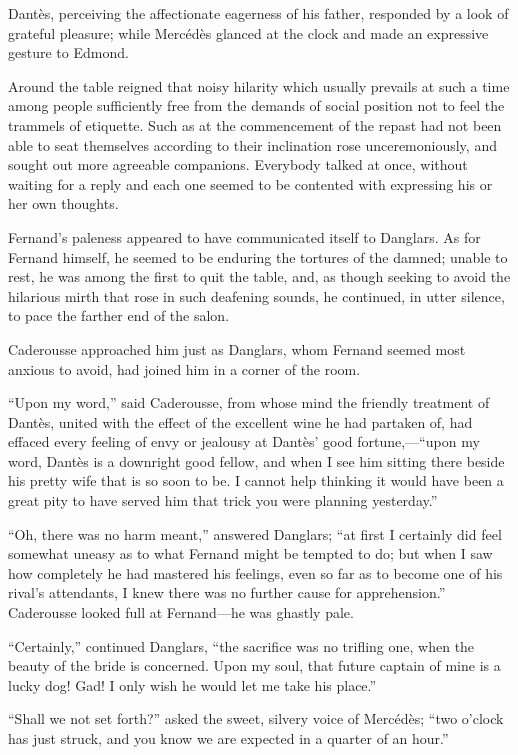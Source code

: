 Dantès, perceiving the affectionate eagerness of his father, responded
by a look of grateful pleasure; while Mercédès glanced at the clock and
made an expressive gesture to Edmond.

Around the table reigned that noisy hilarity which usually prevails at
such a time among people sufficiently free from the demands of social
position not to feel the trammels of etiquette. Such as at the
commencement of the repast had not been able to seat themselves
according to their inclination rose unceremoniously, and sought out
more agreeable companions. Everybody talked at once, without waiting
for a reply and each one seemed to be contented with expressing his or
her own thoughts.

Fernand’s paleness appeared to have communicated itself to Danglars. As
for Fernand himself, he seemed to be enduring the tortures of the
damned; unable to rest, he was among the first to quit the table, and,
as though seeking to avoid the hilarious mirth that rose in such
deafening sounds, he continued, in utter silence, to pace the farther
end of the salon.

Caderousse approached him just as Danglars, whom Fernand seemed most
anxious to avoid, had joined him in a corner of the room.

“Upon my word,” said Caderousse, from whose mind the friendly treatment
of Dantès, united with the effect of the excellent wine he had partaken
of, had effaced every feeling of envy or jealousy at Dantès’ good
fortune,—“upon my word, Dantès is a downright good fellow, and when I
see him sitting there beside his pretty wife that is so soon to be. I
cannot help thinking it would have been a great pity to have served him
that trick you were planning yesterday.”

“Oh, there was no harm meant,” answered Danglars; “at first I certainly
did feel somewhat uneasy as to what Fernand might be tempted to do; but
when I saw how completely he had mastered his feelings, even so far as
to become one of his rival’s attendants, I knew there was no further
cause for apprehension.” Caderousse looked full at Fernand—he was
ghastly pale.

“Certainly,” continued Danglars, “the sacrifice was no trifling one,
when the beauty of the bride is concerned. Upon my soul, that future
captain of mine is a lucky dog! Gad! I only wish he would let me take
his place.”

“Shall we not set forth?” asked the sweet, silvery voice of Mercédès;
“two o’clock has just struck, and you know we are expected in a quarter
of an hour.”

